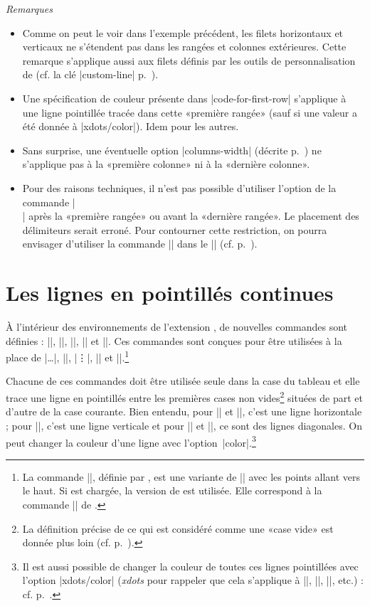 \documentclass[dvipsnames]{article}%
\begin{document}
\emph{Remarques}
\begin{itemize}[beginpenalty=10000]
\item Comme on peut le voir dans l'exemple précédent, les filets horizontaux et
verticaux ne s'étendent pas dans les rangées et colonnes extérieures. Cette
remarque s'applique aussi aux filets définis par les outils de personnalisation
de  (cf. la clé |custom-line| p.~\pageref{custom-line}).

\item Une spécification de couleur présente dans |code-for-first-row| s'applique
à une ligne pointillée tracée dans cette «première rangée» (sauf si une valeur a
été donnée à |xdots/color|). Idem pour les autres.
\item Sans surprise, une éventuelle option |columns-width| (décrite
p.~\pageref{width}) ne s'applique pas à la «première colonne» ni à la «dernière
colonne».
\item Pour des raisons techniques, il n'est pas possible d'utiliser l'option de
la commande |\\| après la «première rangée» ou avant la «dernière rangée». Le
placement des délimiteurs serait erroné. Pour contourner cette restriction, on
pourra envisager d'utiliser la commande |\SubMatrix| dans le |\CodeAfter| (cf.
p.~\pageref{sub-matrix}).
\end{itemize}




\section{Les lignes en pointillés continues}

\label{Cdots}

À l'intérieur des environnements de l'extension , de nouvelles
commandes sont définies : |\Ldots|, |\Cdots|, |\Vdots|, |\Ddots| et |\Iddots|.
Ces commandes sont conçues pour être utilisées à la place de |\dots|, |\cdots|,
|\vdots|, |\ddots| et |\iddots|.\footnote{La commande |\iddots|, définie par
  , est une variante de |\ddots| avec les points allant vers le
  haut. Si  est chargée, la version de  est
  utilisée. Elle correspond à la commande |\adots| de .}
 \setcounter{fniddots}{\thefootnote}

\smallskip
Chacune de ces commandes doit être utilisée seule dans la case du tableau et
elle trace une ligne en pointillés entre les premières cases non
vides\footnote{La définition précise de ce qui est considéré comme une «case
  vide» est donnée plus loin (cf. p.~\pageref{empty-cells}).} situées de part et
d'autre de la case courante. Bien entendu, pour |\Ldots| et |\Cdots|, c'est une
ligne horizontale ; pour |\Vdots|, c'est une ligne verticale et pour |\Ddots| et
|\Iddots|, ce sont des lignes diagonales. On peut changer la couleur d'une ligne
avec l'option~|color|.\footnote{Il est aussi possible de changer la couleur de
  toutes ces lignes pointillées avec l'option |xdots/color| (\textsl{xdots} pour
  rappeler que cela s'applique à |\Cdots|, |\Ldots|, |\Vdots|, etc.) : cf.
  p.~\pageref{customization}. }\par\nobreak
\end{document}
